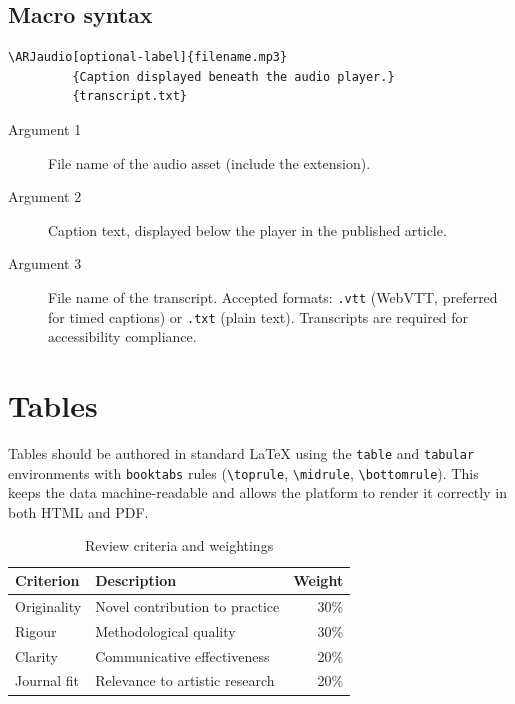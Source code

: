 \subsection{Macro syntax}

\begin{verbatim}
\ARJaudio[optional-label]{filename.mp3}
         {Caption displayed beneath the audio player.}
         {transcript.txt}
\end{verbatim}

\begin{description}
  \item[Argument 1] File name of the audio asset (include the extension).
  \item[Argument 2] Caption text, displayed below the player in the
    published article.
  \item[Argument 3] File name of the transcript. Accepted formats:
    \texttt{.vtt} (WebVTT, preferred for timed captions) or
    \texttt{.txt} (plain text). Transcripts are required for
    accessibility compliance.
\end{description}


\section{Tables}

Tables should be authored in standard LaTeX using the \texttt{table}
and \texttt{tabular} environments with \texttt{booktabs} rules
(\verb|\toprule|, \verb|\midrule|, \verb|\bottomrule|). This keeps
the data machine-readable and allows the platform to render it
correctly in both HTML and PDF.

\begin{table}[ht]
\centering
\caption{Review criteria and weightings}
\label{tab:criteria}
\begin{tabular}{llr}
\toprule
Criterion       & Description                    & Weight \\
\midrule
Originality     & Novel contribution to practice & 30\%   \\
Rigour          & Methodological quality         & 30\%   \\
Clarity         & Communicative effectiveness    & 20\%   \\
Journal fit     & Relevance to artistic research & 20\%   \\
\bottomrule
\end{tabular}
\end{table}

